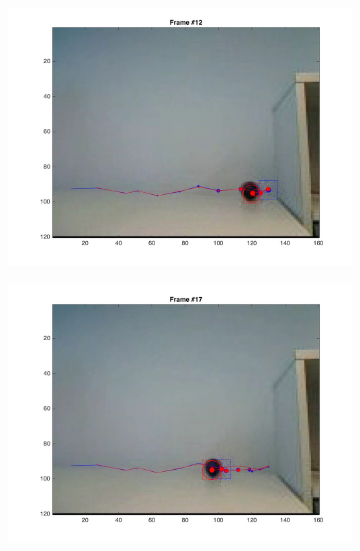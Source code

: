 \documentclass{ethz_report}
\begin{document}
\begin{figure}[h]
\begin{subfigure}[b]{.25\textwidth}
        \includegraphics[width=1\linewidth]{images/video3_noise_low_11}
    \end{subfigure}%
    \begin{subfigure}[b]{.25\textwidth}
        \centering
        \includegraphics[width=1\linewidth]{images/video3_noise_low_16}
    \end{subfigure}
    \begin{subfigure}[b]{.25\textwidth}
        \centering

\end{subfigure}
\end{figure}
\end{document}
